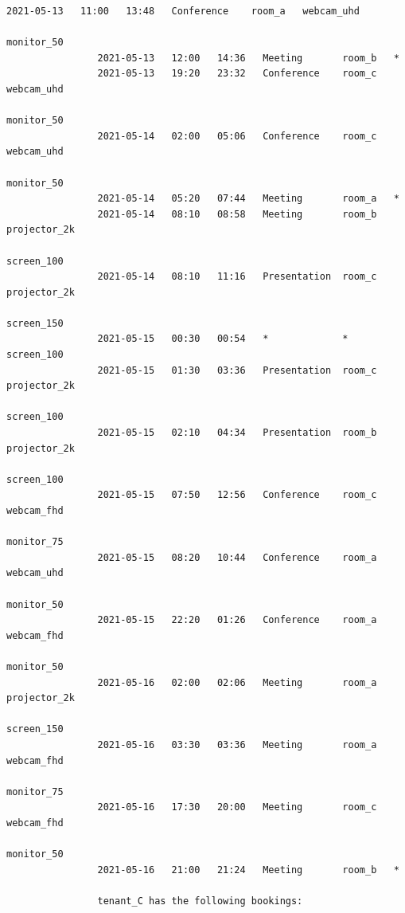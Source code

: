\documentclass{article}
\begin{document}
\begin{Verbatim}[gobble=8]
                2021-05-13   11:00   13:48   Conference    room_a   webcam_uhd
                                                                    monitor_50
                2021-05-13   12:00   14:36   Meeting       room_b   *
                2021-05-13   19:20   23:32   Conference    room_c   webcam_uhd
                                                                    monitor_50
                2021-05-14   02:00   05:06   Conference    room_c   webcam_uhd
                                                                    monitor_50
                2021-05-14   05:20   07:44   Meeting       room_a   *
                2021-05-14   08:10   08:58   Meeting       room_b   projector_2k
                                                                    screen_100
                2021-05-14   08:10   11:16   Presentation  room_c   projector_2k
                                                                    screen_150
                2021-05-15   00:30   00:54   *             *        screen_100
                2021-05-15   01:30   03:36   Presentation  room_c   projector_2k
                                                                    screen_100
                2021-05-15   02:10   04:34   Presentation  room_b   projector_2k
                                                                    screen_100
                2021-05-15   07:50   12:56   Conference    room_c   webcam_fhd
                                                                    monitor_75
                2021-05-15   08:20   10:44   Conference    room_a   webcam_uhd
                                                                    monitor_50
                2021-05-15   22:20   01:26   Conference    room_a   webcam_fhd
                                                                    monitor_50
                2021-05-16   02:00   02:06   Meeting       room_a   projector_2k
                                                                    screen_150
                2021-05-16   03:30   03:36   Meeting       room_a   webcam_fhd
                                                                    monitor_75
                2021-05-16   17:30   20:00   Meeting       room_c   webcam_fhd
                                                                    monitor_50
                2021-05-16   21:00   21:24   Meeting       room_b   *
                
                tenant_C has the following bookings:
                

\end{Verbatim}
\end{document}
